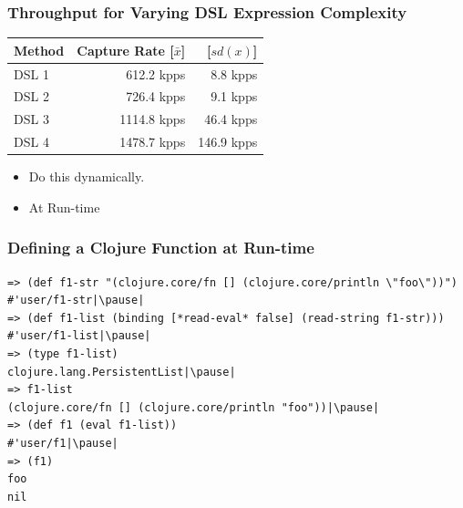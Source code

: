 \documentclass[aspectratio=169]{beamer}
\begin{document}
\begin{frame}
\frametitle{Throughput for Varying DSL Expression Complexity}
\begin{table}
\centering
\begin{tabular}[!htb]{l r r}
    Method       &  Capture Rate [$\bar{x}$] & [$sd(x)$]    \\\toprule
    DSL 1        &   612.2 kpps &   8.8 kpps \\
    DSL 2        &   726.4 kpps &   9.1 kpps \\
    DSL 3        &  1114.8 kpps &  46.4 kpps \\
    DSL 4        &  1478.7 kpps & 146.9 kpps \\\bottomrule
\end{tabular}
\label{tbl:dsl_performance_comparison}
\end{table}
\pause
    \begin{itemize}
        \item Do this dynamically.
        \item At Run-time
    \end{itemize}
\end{frame}



\begin{frame}[fragile]
\frametitle{Defining a Clojure Function at Run-time}
\begin{lstlisting}[]
=> (def f1-str "(clojure.core/fn [] (clojure.core/println \"foo\"))")
#'user/f1-str|\pause|
=> (def f1-list (binding [*read-eval* false] (read-string f1-str)))
#'user/f1-list|\pause|
=> (type f1-list)
clojure.lang.PersistentList|\pause|
=> f1-list
(clojure.core/fn [] (clojure.core/println "foo"))|\pause|
=> (def f1 (eval f1-list))
#'user/f1|\pause|
=> (f1)
foo
nil
\end{lstlisting}
\end{frame}


\end{document}
